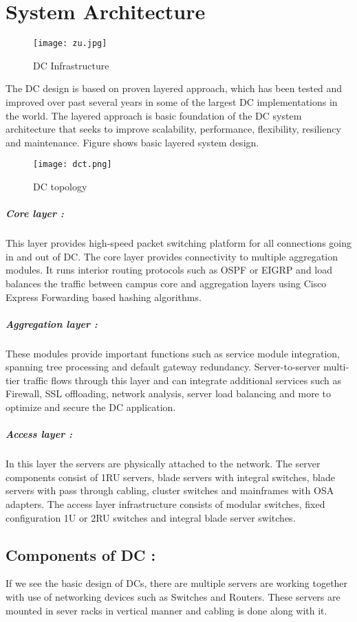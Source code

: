 \documentclass[12pt,a4paper]{report}
\begin{document}
\newpage
\section{System Architecture}

\begin{figure}[h]
\begin{center}
\texttt{[image: zu.jpg]}
\caption{DC Infrastructure}
\end{center}
\end{figure}

The DC design is based on proven layered approach, which has been tested and improved over past several years in some of the largest DC implementations in the world. The layered approach is basic foundation of the DC system architecture that seeks to improve scalability,  performance, flexibility, resiliency and maintenance. Figure shows basic layered system design.
\begin{figure}[h]
\begin{center}
\texttt{[image: dct.png]}
\caption{DC topology}
\end{center}
\end{figure}

\subparagraph{Core layer :}	 This layer provides high-speed packet switching platform for all connections going in and out of DC. The core layer provides connectivity to multiple aggregation modules. It runs interior routing protocols such as OSPF or EIGRP and load balances the traffic between campus core and aggregation layers using Cisco Express Forwarding based hashing algorithms.
\subparagraph{Aggregation layer :} These modules provide important functions such as service module integration, spanning tree processing and default gateway redundancy. Server-to-server multi-tier traffic flows through this layer and can integrate additional services such as Firewall, SSL offloading, network analysis, server load balancing and more to optimize and secure the DC application.
\subparagraph{Access layer :} In this layer the servers are physically attached to the network. The server components consist of 1RU servers, blade servers with integral switches, blade servers with pass through cabling, cluster switches and mainframes with OSA adapters. The access layer infrastructure consists of modular switches, fixed configuration 1U or 2RU switches and integral blade server switches. 

\subsection{Components of DC :}
If we see the basic design of DCs, there are multiple servers are working together with use of networking devices such as Switches and Routers. These servers are mounted in sever racks in vertical manner and cabling is done along with it.\\
\end{document}
